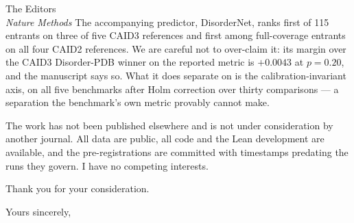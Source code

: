 \documentclass[11pt,a4paper]{letter}
\begin{document}
\begin{letter}{The Editors\\ \emph{Nature Methods}}
The accompanying predictor, DisorderNet, ranks first of 115 entrants on three of
five CAID3 references and first among full-coverage entrants on all four CAID2
references. We are careful not to over-claim it: its margin over the CAID3
Disorder-PDB winner on the reported metric is $+0.0043$ at $p = 0.20$, and the
manuscript says so. What it does separate on is the calibration-invariant axis,
on all five benchmarks after Holm correction over thirty comparisons --- a
separation the benchmark's own metric provably cannot make.

The work has not been published elsewhere and is not under consideration by
another journal. All data are public, all code and the Lean development are
available, and the pre-registrations are committed with timestamps predating the
runs they govern. I have no competing interests.

Thank you for your consideration.

\closing{Yours sincerely,}

\end{letter}
\end{document}
